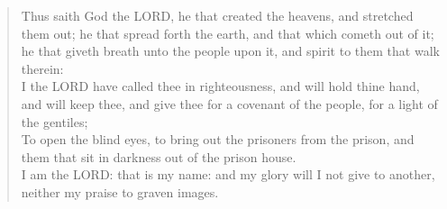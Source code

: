 \documentclass[MAIN]{subfiles}
\begin{document}
\begin{verse}
Thus saith God the {\hge LORD}, he that created the heavens, and stretched them out; he that spread forth the earth, and that which cometh out of it; he that giveth breath unto the people upon it, and spirit to them that walk therein:\\
I the {\hge LORD} have called thee in righteousness, and will hold thine hand, and will keep thee, and give thee for a covenant of the people, for a light of the gentiles;\\
To open the blind eyes, to bring out the prisoners from the prison, and them that sit in darkness out of the prison house.\\
I am the {\hge LORD}: that is my name: and my glory will I not give to another, neither my praise to graven images.
\end{verse}
\end{document}
